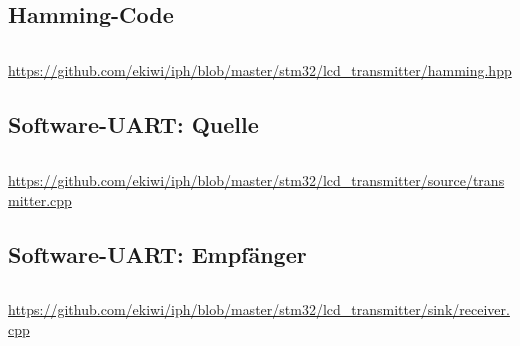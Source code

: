 \documentclass[12pt,a4paper]{article}
\begin{document}
\subsection{Hamming-Code}
\label{app:code_hamming}
\inputminted[label=hamming.hpp,linenos,tabsize=4,fontsize=\normalsize,frame=lines,rulecolor=\color{gray!70},framerule=1pt]{c++}{../stm32/lcd_transmitter/hamming.hpp}
\url{https://github.com/ekiwi/iph/blob/master/stm32/lcd\_transmitter/hamming.hpp}

\subsection{Software-UART: Quelle}
\inputminted[label=transmitter.cpp,linenos,tabsize=4,fontsize=\normalsize,frame=lines,rulecolor=\color{gray!70},framerule=1pt]{c++}{../stm32/lcd_transmitter/source/transmitter.cpp}
\url{https://github.com/ekiwi/iph/blob/master/stm32/lcd\_transmitter/source/transmitter.cpp}

\subsection{Software-UART: Empfänger}
\label{app:uart_receiver}
\inputminted[label=receiver.cpp,linenos,tabsize=4,fontsize=\normalsize,frame=lines,rulecolor=\color{gray!70},framerule=1pt]{c++}{../stm32/lcd_transmitter/sink/receiver.cpp}
\url{https://github.com/ekiwi/iph/blob/master/stm32/lcd\_transmitter/sink/receiver.cpp}
\end{document}
